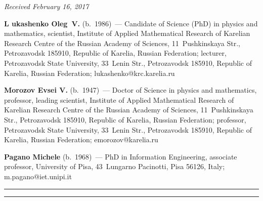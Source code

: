 \vspace*{-12pt}

\hfill{\small\textit{Received February 16, 2017}}




\Contr


\noindent
\textbf{L ukashenko Oleg~V.} (b.\ 1986)~--- Candidate of Science (PhD) 
in physics and mathematics, scientist, 
Institute of  Applied Mathematical Research of Karelian Research Centre of 
the Russian Academy of Sciences, 11~Pushkinskaya Str.,  Petrozavodsk 185910, 
Republic of Karelia, Russian Federation; 
lecturer, Petrozavodsk State University, 33~Lenin Str., Petrozavodsk 185910, 
Republic of Karelia, Russian Federation; \mbox{lukashenko@krc.karelia.ru}


\vspace*{3pt}

\noindent
\textbf{Morozov Evsei V.} (b.\ 1947)~--- 
Doctor of Science in physics and mathematics, professor, leading scientist, 
Institute of  Applied Mathematical Research of Karelian Research Centre of the
Russian Academy of Sciences, 11~Pushkinskaya Str.,  
Petrozavodsk 185910, Republic of Karelia, Russian Federation; professor,
 Petrozavodsk State University, 33~Lenin Str., Petrozavodsk 185910, 
 Republic of Karelia, Russian Federation; \mbox{emorozov@karelia.ru}
 
 \vspace*{3pt}
 
 \noindent
 \textbf{Pagano Michele} (b.\ 1968)~--- 
 PhD in Information Engineering, associate professor, University of Pisa, 
 43~Lungarno Pacinotti, Pisa 56126, Italy; \mbox{m.pagano@iet.unipi.it}




\vspace*{12pt}

\hrule

\vspace*{2pt}

\hrule



\vspace*{8pt}

\def\tit{ОБ ЭФФЕКТИВНОСТИ ОЦЕНКИ МОНТЕ КАРЛО\\ НА ОСНОВЕ ГАУССОВСКОГО МОСТА$^*$}

\def\aut{О.\,В.~Лукашенко$^{1,2}$,
 Е.\,В.~Морозов$^{1,2}$,   М.~Пагано$^{3}$}


